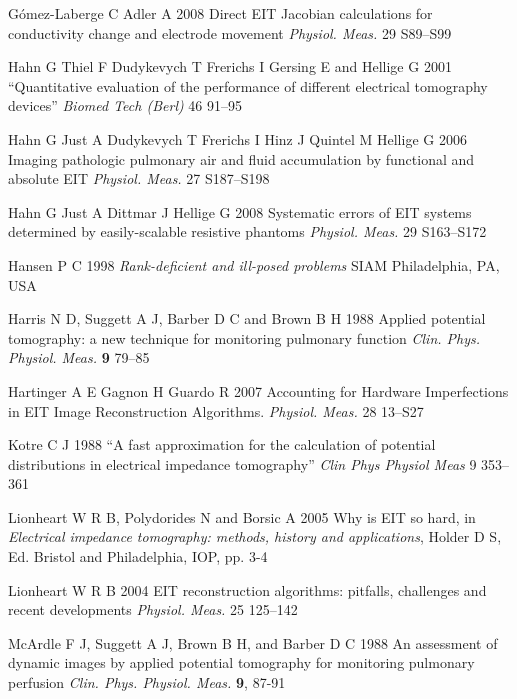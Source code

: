 \documentclass[12pt]{iopart}
\begin{document}
G\'omez-Laberge C Adler A 2008
Direct EIT Jacobian calculations for conductivity change and electrode movement
{\em Physiol. Meas.}
29 S89--S99


\item[]
Hahn G Thiel F Dudykevych T Frerichs I Gersing E
and Hellige G 2001
``Quantitative evaluation of the performance of
different electrical tomography devices''
{\em  Biomed Tech (Berl)}
46 91--95

\item[]
Hahn G Just A Dudykevych T Frerichs I Hinz J  Quintel M Hellige G
2006
Imaging pathologic pulmonary air and fluid accumulation by
 functional and absolute EIT
{\em Physiol. Meas.}
27 S187--S198

\item[]
Hahn G Just A Dittmar J  Hellige G 2008
Systematic errors of EIT systems determined by easily-scalable
 resistive phantoms
{\em Physiol. Meas.}
 29 S163--S172


\item[]
Hansen P C 1998 {\em Rank-deficient and ill-posed problems}
SIAM Philadelphia, PA, USA

\item[]
Harris N D, Suggett A J, Barber D C and Brown B H 1988 Applied
potential tomography: a new technique for monitoring pulmonary
function {\em Clin. Phys. Physiol. Meas.} {\bf 9} 79--85

\item[]
Hartinger A E Gagnon H Guardo R 2007
Accounting for Hardware Imperfections in EIT Image
Reconstruction Algorithms.
{\em Physiol. Meas.}
28 13--S27
 
\item[]
Kotre C J 1988
``A fast approximation for the calculation of potential distributions in electrical impedance tomography''
{\em Clin Phys Physiol Meas}
9 353--361

\item[]
Lionheart W R B, Polydorides N and Borsic A 2005 Why is EIT so hard,
in {\em Electrical impedance tomography: methods, history and
applications}, Holder D S, Ed. Bristol and Philadelphia, IOP, pp.
3-4

\item[]
Lionheart W R B 2004
EIT reconstruction algorithms: pitfalls, challenges
and recent developments
{\em Physiol. Meas.}
25 125--142

\item[]
McArdle F J, Suggett A J, Brown B H, and Barber D C 1988 An
assessment of dynamic images by applied potential tomography for
monitoring pulmonary perfusion {\em Clin. Phys. Physiol. Meas.}
{\bf 9}, 87-91
\end{document}
